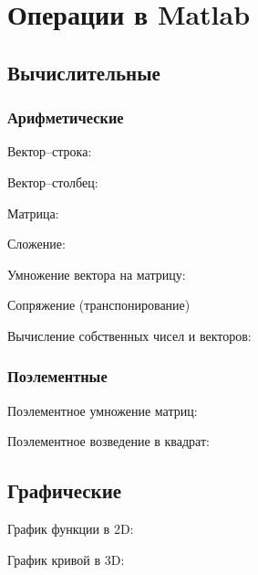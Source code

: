\chapter{Операции в Matlab}

\section{Вычислительные}

\subsection{Арифметические}

Вектор--строка:

Вектор--столбец:

Матрица:

Сложение:
\begin{Matlab}
\end{Matlab}

Умножение вектора на матрицу:

Сопряжение (транспонирование)

Вычисление собственных чисел и векторов:
\begin{Matlab}
\end{Matlab}

\subsection{Поэлементные}

Поэлементное умножение матриц:
\begin{Matlab}
\end{Matlab}

Поэлементное возведение в квадрат:
\begin{Matlab}
\end{Matlab}

\section{Графические}

График функции в 2D:
\begin{Matlab}
\end{Matlab}

График кривой в 3D:
\begin{Matlab}
\end{Matlab}